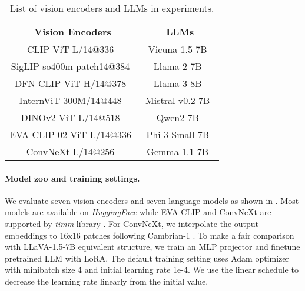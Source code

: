 \begin{table}[h]
\centering
\begin{tabular}{cc}
    \toprule
    Vision Encoders & LLMs \\
    \midrule
    CLIP-ViT-L/14@336~\cite{radford2021learning} & Vicuna-1.5-7B~\cite{vicuna2023} \\
    SigLIP-so400m-patch14@384~\cite{zhai2023sigmoid} & Llama-2-7B~\cite{touvron2023llama2}\\
    DFN-CLIP-ViT-H/14@378~\cite{fangdata}  & Llama-3-8B~\cite{dubey2024llama} \\
    InternViT-300M/14@448~\cite{chen2024internvl}   & Mistral-v0.2-7B~\cite{jiang2023mistral}\\
    DINOv2-ViT-L/14@518~\cite{oquab2023dinov2} & Qwen2-7B~\cite{yang2024qwen2technicalreport}\\
    EVA-CLIP-02-ViT-L/14@336~\cite{sun2023eva} &  Phi-3-Small-7B~\cite{abdin2024phi}\\
    ConvNeXt-L/14@256~\cite{ilharco_gabriel_2021_5143773} & Gemma-1.1-7B~\cite{team2024gemma} \\
\bottomrule
\end{tabular}
\caption{List of vision encoders and LLMs in experiments.
\label{table:model_zoo}}
\end{table}%



\paragraph{Model zoo and training settings.} We evaluate seven vision encoders and seven language models as shown in . Most models are available on \textit{HuggingFace} \cite{huggingface_models_website} while EVA-CLIP and ConvNeXt are supported by \textit{timm} library \cite{rw2019timm}. For ConvNeXt, we interpolate the output embeddings to 16x16 patches following Cambrian-1 \cite{tong2024cambrian}. 
To make a fair comparison with LLaVA-1.5-7B equivalent structure, we train an MLP projector and finetune pretrained LLM with LoRA. The default training setting uses Adam optimizer with minibatch size 4 and initial learning rate 1e-4. We use the linear schedule to decrease the learning rate linearly from the initial value. 

